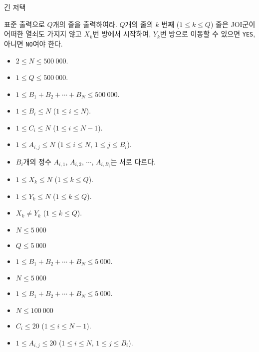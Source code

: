 \begin{problem}{긴 저택}
	
	\OutputFile
	
	표준 출력으로 $Q$개의 줄을 출력하여라. $Q$개의 줄의 $k$ 번째 ($ 1 \le k \le Q$) 줄은 JOI군이 어떠한 열쇠도 가지지 않고 $X_k$번 방에서 시작하여, $Y_k$번 방으로 이동할 수 있으면 \texttt{YES}, 아니면 \texttt{NO}여야 한다.
	
	\Constraints
	
	\begin{itemize}
		
		\item $2 \le N \le 500\ 000$.
		\item $1 \le Q \le 500\ 000$.
		\item $1 \le B_1 + B_2 + \cdots + B_N \le 500\ 000$.
		\item $1 \le B_i \le N$ ($1 \le i \le N$).
		\item $1 \le C_i \le N$ ($1 \le i \le N-1$).
		\item $1 \le A_{i, j} \le N$ ($1 \le i \le N$, $1 \le j \le B_i$).
		\item $B_i$개의 정수 $A_{i, 1}$, $A_{i, 2}$, $\cdots$, $A_{i, B_i}$는 서로 다르다.
		\item $1 \le X_k \le N$ ($1 \le k \le Q$).
		\item $1 \le Y_k \le N$ ($1 \le k \le Q$).
		\item $X_k \ne Y_k$ ($1 \le k \le Q$).
	\end{itemize}
	
	
	\begin{itemize}
		\item $N \le 5\ 000$
		\item $Q \le 5\ 000$
		\item $1 \le B_1 + B_2 + \cdots + B_N \le 5\ 000$.
	\end{itemize}

	\begin{itemize}
		\item $N \le 5\ 000$
		\item $1 \le B_1 + B_2 + \cdots + B_N \le 5\ 000$.
	\end{itemize}
	
	\begin{itemize}
		\item $N \le 100\ 000$
		\item $C_i \le 20$ ($1 \le i \le N-1$).
		\item $1 \le A_{i, j} \le 20$ ($1 \le i \le N$, $1 \le j \le B_i$).
	\end{itemize}
	

\end{problem}
